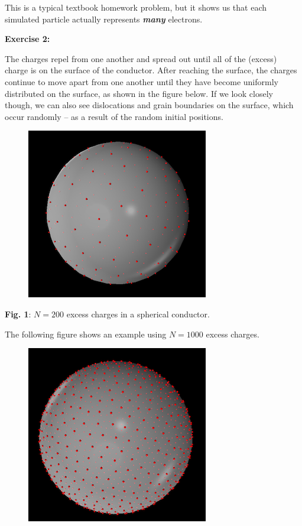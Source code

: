 \documentclass[]{article}
\begin{document}
This is a typical textbook homework problem, but it shows us that each
simulated particle actually represents \textbf{\emph{many}} electrons.

\textbf{Exercise 2:}

The charges repel from one another and spread out until all of the
(excess) charge is on the surface of the conductor. After reaching the
surface, the charges continue to move apart from one another until they
have become uniformly distributed on the surface, as shown in the figure
below. If we look closely though, we can also see dislocations and grain
boundaries on the surface, which occur randomly -- as a result of the
random initial positions.

\begin{figure}[htbp]
\centering
\includegraphics{images/screen_shot_1b.png}
\caption{}
\end{figure}

\textbf{Fig. 1}: \(N = 200\) excess charges in a spherical conductor.

The following figure shows an example using \(N = 1000\) excess charges.

\begin{figure}[htbp]
\centering
\includegraphics{images/screen_shot_2.png}
\caption{}
\end{figure}
\end{document}
